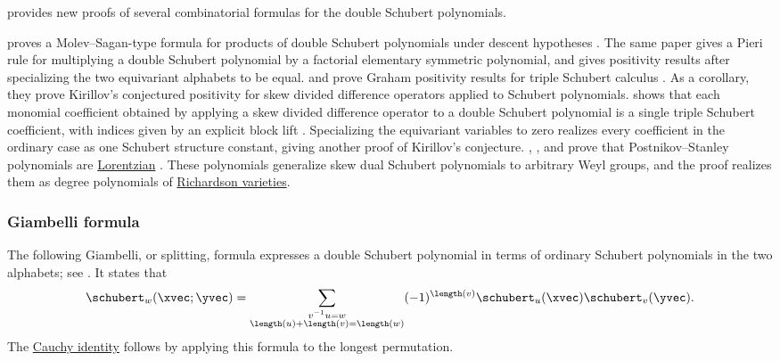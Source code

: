  \cite{Knutson2019} provides new proofs of
several combinatorial formulas for the double Schubert polynomials.

 proves a Molev--Sagan-type formula for products
of double Schubert polynomials under descent hypotheses \cite{Samuel2024}.
The same paper gives a Pieri rule for multiplying a double Schubert polynomial
by a factorial elementary symmetric polynomial, and gives positivity results
after specializing the two equivariant alphabets to be equal.
 and  prove Graham positivity results for
triple Schubert calculus \cite{GaoXiong2025x}.  As a corollary, they prove
Kirillov's conjectured positivity for skew divided difference operators
applied to Schubert polynomials.
 shows that each monomial coefficient obtained by
applying a skew divided difference operator to a double Schubert polynomial
is a single triple Schubert coefficient, with indices given by an explicit
block lift \cite{Hwang2026x}.  Specializing the equivariant variables to zero
realizes every coefficient in the ordinary case as one Schubert structure
constant, giving another proof of Kirillov's conjecture.
, , and  prove that
Postnikov--Stanley polynomials are \hyperref[lorentzianPolynomial]{Lorentzian}
\cite{AnTungZhang2024Lorentzian}.  These polynomials generalize skew dual
Schubert polynomials to arbitrary Weyl groups, and the proof realizes them as
degree polynomials of \hyperref[richardsonVarieties]{Richardson varieties}.


\subsubsection[schubertDoubleGiambelliFormula]{Giambelli formula}

The following Giambelli, or splitting, formula expresses a double Schubert
polynomial in terms of ordinary Schubert polynomials in the two alphabets; see
\cite{Macdonald1991}.  It states that
\begin{equation*}
 \schubert_w(\xvec;\yvec) = \sum_{\substack{ v^{-1}u=w \\ \length(u)+\length(v) = \length(w) }}
 (-1)^{\length(v)}\schubert_u(\xvec) \schubert_v(\yvec).
\end{equation*}
The \hyperref[schubertCauchyFormula]{Cauchy identity} follows by applying this
formula to the longest permutation.



